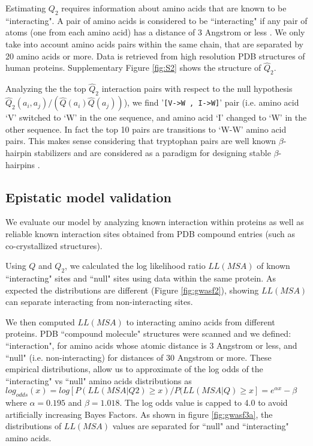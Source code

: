 Estimating $Q_2$ requires information about amino acids that are known to be ``interacting". A pair of amino acids is considered to be ``interacting" if any pair of atoms (one from each amino acid) has a distance of 3 Angstrom or less \cite{burger2010disentangling}. We only take into account amino acids pairs within the same chain, that are separated by 20 amino acids or more. Data is retrieved from high resolution PDB structures of human proteins. Supplementary Figure \ref{fig:S2} shows the structure of $\hat{Q}_2$.

Analyzing the the top $\hat{Q}_2$ interaction pairs with respect to the null hypothesis $\hat{Q}_2(a_i, a_j) / (\hat{Q}(a_i) \hat{Q}(a_j)) $), we find '\texttt{[V->W ,  I->W]}' pair (i.e. amino acid ‘V’ switched to ‘W’ in the one sequence, and amino acid ‘I’ changed to ‘W’ in the other sequence. In fact the top 10 pairs are transitions to ‘W-W’ amino acid pairs. This makes sense considering that tryptophan pairs are well known $\beta$-hairpin stabilizers and are considered as a paradigm for designing stable $\beta$-hairpins \cite{santiveri2010tryptophan}.

\subsection{Epistatic model validation}

We evaluate our model by analyzing known interaction within proteins as well as reliable known interaction sites obtained from PDB compound entries (such as co-crystallized structures). 

Using $Q$ and $Q_2$, we calculated the log likelihood ratio $LL(MSA)$ of known ``interacting" sites and ``null" sites using data within the same protein. As expected the distributions are different (Figure \ref{fig:gwasf2}), showing $LL(MSA)$ can separate interacting from non-interacting sites.


We then computed $LL(MSA)$ to interacting amino acids from  different proteins. PDB ``compound molecule" structures were scanned and we defined: ``interaction", for amino acids whose atomic distance is 3 Angstrom or less, and ``null" (i.e. non-interacting) for distances of 30 Angstrom or more. These empirical distributions, allow us to approximate of the log odds of the ``interacting" vs ``null" amino acids distributions as $log_{odds}(x) = log[P(LL(MSA|Q2) \ge x) / P(LL(MSA|Q) \ge x] = e^{\alpha x}-\beta$ where $\alpha = 0.195$ and $\beta = 1.018$. The log odds value is capped to 4.0 to avoid artificially increasing Bayes Factors. As shown in figure \ref{fig:gwasf3a}, the distributions of $LL(MSA)$ values are separated for ``null" and ``interacting" amino acids. 

